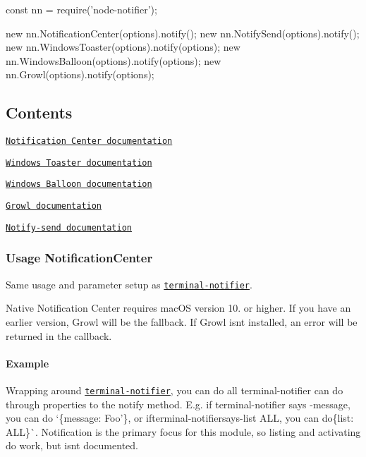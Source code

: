 \begin{DoxyCode}
const nn = require('node-notifier');

new nn.NotificationCenter(options).notify();
new nn.NotifySend(options).notify();
new nn.WindowsToaster(options).notify(options);
new nn.WindowsBalloon(options).notify(options);
new nn.Growl(options).notify(options);
\end{DoxyCode}


\subsection*{Contents}


\begin{DoxyItemize}
\item \href{#usage-notificationcenter}{\tt Notification Center documentation}
\item \href{#usage-windowstoaster}{\tt Windows Toaster documentation}
\item \href{#usage-windowsballoon}{\tt Windows Balloon documentation}
\item \href{#usage-growl}{\tt Growl documentation}
\item \href{#usage-notifysend}{\tt Notify-\/send documentation}
\end{DoxyItemize}

\subsubsection*{Usage Notification\+Center}

Same usage and parameter setup as \href{https://github.com/julienXX/terminal-notifier}{\tt terminal-\/notifier}.

Native Notification Center requires mac\+OS version 10. or higher. If you have an earlier version, Growl will be the fallback. If Growl isn\textquotesingle{}t installed, an error will be returned in the callback.

\paragraph*{Example}

Wrapping around \href{https://github.com/julienXX/terminal-notifier}{\tt terminal-\/notifier}, you can do all terminal-\/notifier can do through properties to the {\ttfamily notify} method. E.\+g. if {\ttfamily terminal-\/notifier} says {\ttfamily -\/message}, you can do `\{message\+: \textquotesingle{}Foo'\}{\ttfamily , or if}terminal-\/notifier{\ttfamily says}-\/list A\+LL{\ttfamily , you can do}\{list\+: \textquotesingle{}A\+LL\textquotesingle{}\}\`{}. Notification is the primary focus for this module, so listing and activating do work, but isn\textquotesingle{}t documented.

